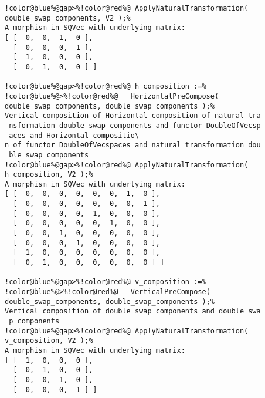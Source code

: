 \begin{Verbatim}[commandchars=!@\%,frame=single]
!color@blue%@gap>%!color@red%@ ApplyNaturalTransformation( double_swap_components, V2 );%
A morphism in SQVec with underlying matrix:
[ [  0,  0,  1,  0 ],
  [  0,  0,  0,  1 ],
  [  1,  0,  0,  0 ],
  [  0,  1,  0,  0 ] ]

!color@blue%@gap>%!color@red%@ h_composition :=%
!color@blue%@>%!color@red%@   HorizontalPreCompose( double_swap_components, double_swap_components );%
Vertical composition of Horizontal composition of natural tra
 nsformation double swap components and functor DoubleOfVecsp
 aces and Horizontal compositio\
n of functor DoubleOfVecspaces and natural transformation dou
 ble swap components
!color@blue%@gap>%!color@red%@ ApplyNaturalTransformation( h_composition, V2 );%
A morphism in SQVec with underlying matrix:
[ [  0,  0,  0,  0,  0,  0,  1,  0 ],
  [  0,  0,  0,  0,  0,  0,  0,  1 ],
  [  0,  0,  0,  0,  1,  0,  0,  0 ],
  [  0,  0,  0,  0,  0,  1,  0,  0 ],
  [  0,  0,  1,  0,  0,  0,  0,  0 ],
  [  0,  0,  0,  1,  0,  0,  0,  0 ],
  [  1,  0,  0,  0,  0,  0,  0,  0 ],
  [  0,  1,  0,  0,  0,  0,  0,  0 ] ]

!color@blue%@gap>%!color@red%@ v_composition :=%
!color@blue%@>%!color@red%@   VerticalPreCompose( double_swap_components, double_swap_components );%
Vertical composition of double swap components and double swa
 p components
!color@blue%@gap>%!color@red%@ ApplyNaturalTransformation( v_composition, V2 );%
A morphism in SQVec with underlying matrix:
[ [  1,  0,  0,  0 ],
  [  0,  1,  0,  0 ],
  [  0,  0,  1,  0 ],
  [  0,  0,  0,  1 ] ]

\end{Verbatim}
